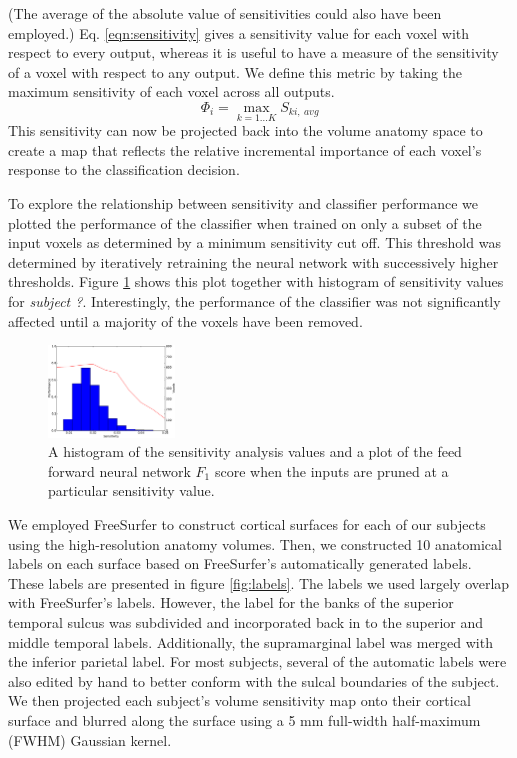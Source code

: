 \documentclass[preprint,5p,authoryear]{elsarticle}
\begin{document}
(The average of the absolute value of sensitivities could also have been employed.)
Eq. \ref{eqn:sensitivity} gives a sensitivity value for each voxel with respect to every output, whereas it is useful to have a measure of the sensitivity of a voxel with respect to any output.
We define this metric by taking the maximum sensitivity of each voxel across all outputs.
\begin{equation}
\Phi_{i} = \max_{k=1 \dots K}{S_{ki,~avg}}
\end{equation}
This sensitivity can now be projected back into the volume anatomy space to create a  map that reflects the relative incremental importance of each voxel's response to the classification decision.

To  explore the relationship between sensitivity and classifier performance we plotted the performance of the classifier when trained on only a subset of the input voxels as determined by a minimum sensitivity cut off.
This threshold was determined by iteratively retraining the neural network with successively higher thresholds.
Figure \ref{fig:sensitivity-cutoff} shows this plot together with histogram of sensitivity values for \emph{subject ?}.
Interestingly, the performance of the classifier was not significantly affected until a majority of the voxels have been removed.

\begin{figure}
\centering
\includegraphics[width=0.3\textwidth]{figures/performance-verse-sensitivity-cutoff}
\caption{A histogram of the sensitivity analysis values and a plot of the feed forward neural network $F_1$ score when the inputs are pruned at a particular sensitivity value. }
\label{fig:sensitivity-cutoff}
\end{figure}

We employed FreeSurfer \citep{FreeSurfer} to construct cortical surfaces for each of our subjects using the high-resolution anatomy volumes.
Then, we constructed 10 anatomical labels on each surface based on FreeSurfer's automatically generated labels.
These labels are presented in figure \ref{fig:labels}.
The labels we used largely overlap with FreeSurfer's labels.
However, the label for the banks of the superior temporal sulcus was subdivided and incorporated back in to the superior and middle temporal labels.
Additionally, the supramarginal label was merged with the inferior parietal label.
For most subjects, several of the automatic labels were also edited by hand to better conform with the sulcal boundaries of the subject.
We then projected each subject's volume sensitivity map onto their cortical surface and blurred along the surface using a 5 mm full-width half-maximum (FWHM) Gaussian kernel.
\end{document}
